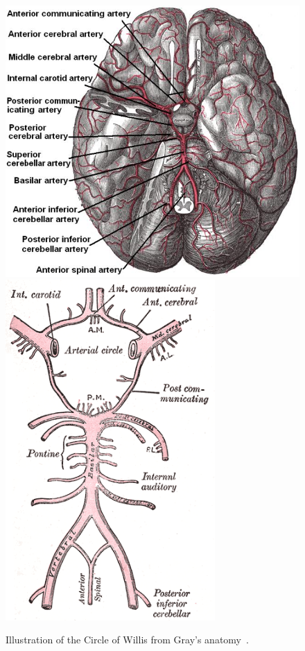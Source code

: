 \begin{figure}
  \begin{center}
    \includegraphics[width=\largefig]{chapters/kvs-2/png/cow_gray_1.png} \\
    \vspace{1.5cm}
    \includegraphics[width=8cm]{chapters/kvs-2/png/cow_gray_2.png}
  \end{center}
  \caption{Illustration of the Circle of Willis from Gray's anatomy~\citep{Gray1897}.}
  \label{fig:kvs-2:textbook-circle}
\end{figure}

